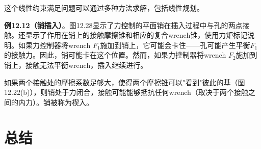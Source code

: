 \documentclass[12pt,a4paper]{article}
\begin{document}
这个线性约束满足问题可以通过多种方法求解，包括线性规划。

\textbf{例12.12（销插入）}。图12.28显示了力控制的平面销在插入过程中与孔的两点接触。还显示了作用在销上的接触摩擦锥和相应的复合wrench锥，使用力矩标记说明。如果力控制器将wrench $F_1$施加到销上，它可能会卡住——孔可能产生平衡$F_1$的接触力。因此，销可能卡在这个位置。然而，如果力控制器将wrench $F_2$施加到销上，接触无法平衡wrench，插入继续进行。

如果两个接触处的摩擦系数足够大，使得两个摩擦锥可以"看到"彼此的基（图12.22(b)），则销处于力闭合，接触可能能够抵抗任何wrench（取决于两个接触之间的内力）。销被称为楔入。

\section{总结}
\label{sec:summary}
\end{document}
